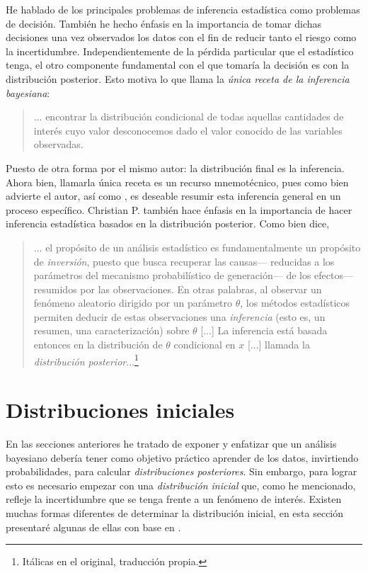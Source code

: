He hablado de los principales problemas de inferencia estadística como problemas de decisión. También he hecho énfasis en la importancia de tomar dichas decisiones una vez observados los datos con el fin de reducir tanto el riesgo como la incertidumbre. Independientemente de la pérdida particular que el estadístico tenga, el otro componente fundamental con el que tomaría la decisión es con la distribución posterior. Esto motiva lo que \textcite[p.29]{GP16} llama la \textit{única receta de la inferencia bayesiana}: 
\begin{quote}
... encontrar la distribución condicional de todas aquellas cantidades de interés cuyo valor desconocemos dado el valor conocido de las variables observadas.
\end{quote}
Puesto de otra forma por el mismo autor: la distribución final es la inferencia. Ahora bien, llamarla única receta es un recurso mnemotécnico, pues como bien advierte el autor, así como \textcite{Berger85}, es deseable resumir esta inferencia general en un proceso específico. Christian P. \textcite[8-9]{Robert07} también hace énfasis en la importancia de hacer inferencia estadística basados en la distribución posterior. Como bien dice, 
\begin{quote}
... el propósito de un análisis estadístico es fundamentalmente un propósito de \textit{inversión}, puesto que busca recuperar las causas--- reducidas a los parámetros del mecanismo probabilístico de generación--- de los efectos--- resumidos por las observaciones. En otras palabras, al observar un fenómeno aleatorio dirigido por un parámetro $\theta$, los métodos estadísticos permiten deducir de estas observaciones una \textit{inferencia} (esto es, un resumen, una caracterización) sobre $\theta$ [...] La inferencia está basada entonces en la distribución de $\theta$ condicional en $x$ [...] llamada la \textit{distribución posterior}...\footnote{Itálicas en el original, traducción propia.}
\end{quote}

\section{Distribuciones iniciales}

En las secciones anteriores he tratado de exponer y enfatizar que un análisis bayesiano debería tener como objetivo práctico aprender de los datos, invirtiendo probabilidades, para calcular \textit{distribuciones posteriores}. Sin embargo, para lograr esto es necesario empezar con una \textit{distribución inicial} que, como he mencionado, refleje la incertidumbre que se tenga frente a un fenómeno de interés. Existen muchas formas diferentes de determinar la distribución inicial, en esta sección presentaré algunas de ellas con base en \textcites[Cap. 3]{Berger85}[Cap. 1]{Congdon06}[Caps. 2-3]{Robert07}[Caps. 1-2]{Gelman13}.\\ 

